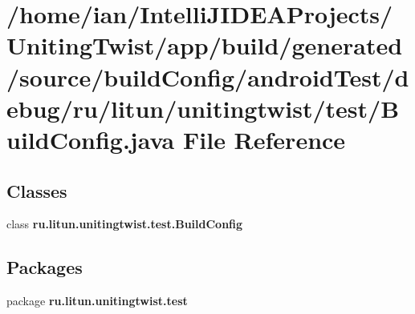 \section{/home/ian/\+Intelli\+J\+I\+D\+E\+A\+Projects/\+Uniting\+Twist/app/build/generated/source/build\+Config/android\+Test/debug/ru/litun/unitingtwist/test/\+Build\+Config.java File Reference}
\label{android_test_2debug_2ru_2litun_2unitingtwist_2test_2_build_config_8java}
\subsection*{Classes}
\begin{DoxyCompactItemize}
\item 
class \textbf{ ru.\+litun.\+unitingtwist.\+test.\+Build\+Config}
\end{DoxyCompactItemize}
\subsection*{Packages}
\begin{DoxyCompactItemize}
\item 
package \textbf{ ru.\+litun.\+unitingtwist.\+test}
\end{DoxyCompactItemize}
